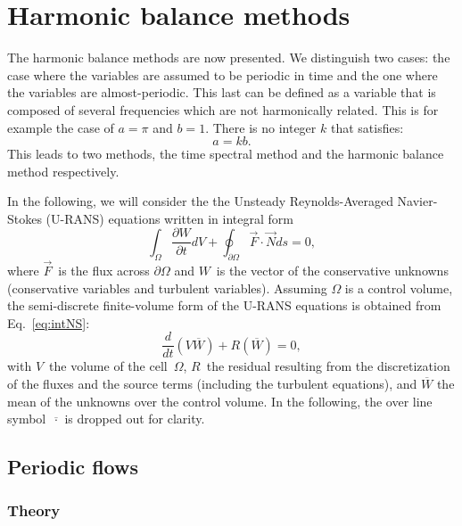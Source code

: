 \chapter{Harmonic balance methods} %
\label{cha:harmonic_balance_methods}

The harmonic balance methods are now presented. 
We distinguish two cases: the case where the 
variables are assumed to be periodic in time and the one
where the variables are almost-periodic. This last can be defined as 
a variable that is composed of several frequencies which 
are not harmonically related. This is for example the case of 
$a=\pi$ and $b=1$. There is no integer $k$ that satisfies:
\begin{equation}
    a = k b.
\end{equation}
This leads to two methods, the time spectral method and the
harmonic balance method respectively.

In the following, we will consider the
the Unsteady Reynolds-Averaged Navier-Stokes (U-RANS) equations written in
integral form
\begin{equation}
   \int_\Omega \frac{\partial W}{\partial t} dV + \oint_{\partial
     \Omega} \overrightarrow{F} \cdot \overrightarrow{N} ds = 0,
   \label{eq:intNS}
\end{equation} 
where $\overrightarrow{F}$~is the flux across $\partial \Omega$ and
$W$~is the vector of the conservative unknowns (conservative variables
and turbulent variables).  Assuming $\Omega$ is a
control volume, the semi-discrete finite-volume form of the
U-RANS equations is obtained from Eq.~\eqref{eq:intNS}:
\begin{equation}
   \frac{d}{dt} \left(V  \overline{W}\right) + R \left( \overline{W}
   \right) = 0,
   \label{eq:semiDiscNS}
\end{equation} 
with $V$~the volume of the cell~$\Omega$, $R$~the residual resulting
from the discretization of the fluxes and the source terms (including
the turbulent equations), and $\overline{W}$ the mean of the
unknowns over the control volume.  In the following, the over line
symbol~$\overline{\cdot}$ is dropped out for clarity.

\section{Periodic flows} %
\label{sec:periodic_flows}

\subsection{Theory}

